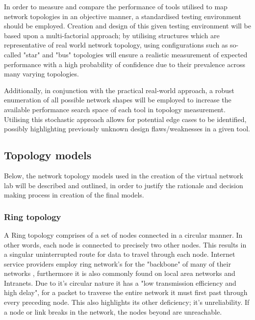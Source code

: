 In order to measure and compare the performance of tools utilised to map network topologies in an objective manner, a standardised testing environment should be employed. Creation and design of this given testing environment will be based upon a multi-factorial approach; by utilising structures which are representative of real world network topology, using configurations such as so-called "star" and "bus" topologies will ensure a realistic measurement of expected performance with a high probability of confidence due to their prevalence across many varying topologies. 

Additionally, in conjunction with the practical real-world approach, a robust enumeration of all possible network shapes will be employed to increase the available performance search space of each tool in topology measurement. Utilising this stochastic approach allows for potential edge cases to be identified, possibly highlighting previously unknown design flaws/weaknesses in a given tool. 

\subsection{Topology models}
Below, the network topology models used in the creation of the virtual network lab will be described and outlined, in order to justify the rationale and decision making process in creation of the final models. 

\subsubsection{Ring topology}
A Ring topology comprises of a set of nodes connected in a circular manner. In other words, each node is connected to precisely two other nodes. This results in a singular uninterrupted route for data to travel through each node. Internet service providers employ ring network's for the "backbone" of many of their networks \cite{ring_network}, furthermore it is also commonly found on local area networks and Intranets. Due to it's circular nature it has a "low transmission efficiency and high delay", for a packet to traverse the entire network it must first past through every preceding node. This also highlights its other deficiency; it's unreliability. If a node or link breaks in the network, the nodes beyond are unreachable. \cite{ring_network}

